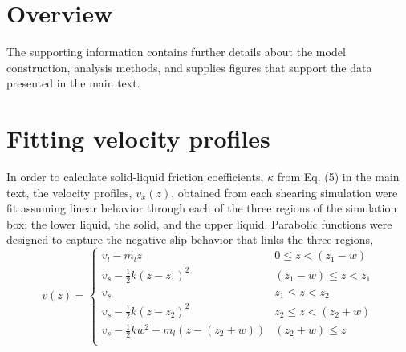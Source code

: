 

% 

\section{Overview}
The supporting information contains further details about the model
construction, analysis methods, and supplies figures that support the
data presented in the main text.

\section{Fitting velocity profiles}
In order to calculate solid-liquid friction coefficients, $\kappa$
from Eq. (5) in the main text, the velocity profiles, $v_x(z)$,
obtained from each shearing simulation were fit assuming linear
behavior through each of the three regions of the simulation box; the
lower liquid, the solid, and the upper liquid. Parabolic functions
were designed to capture the negative slip behavior that links the
three regions,
\begin{equation}\label{vfit}
v(z) =
\begin{cases}
  v_{l} - m_{l}z & 0 \leq z < (z_{1} - w) \\
  v_{s} - \frac{1}{2}k(z-z_{1})^{2} & (z_{1}-w) \leq z < z_{1} \\
  v_{s}  & z_{1} \leq z < z_{2} \\
  v_{s} - \frac{1}{2}k(z-z_{2})^{2}  & z_{2} \leq z <( z_{2} + w)\\
  v_{s} - \frac{1}{2}kw^{2} - m_{l}(z-(z_{2} + w)) & (z_{2} + w) \leq z \\
\end{cases}
\end{equation}
  

